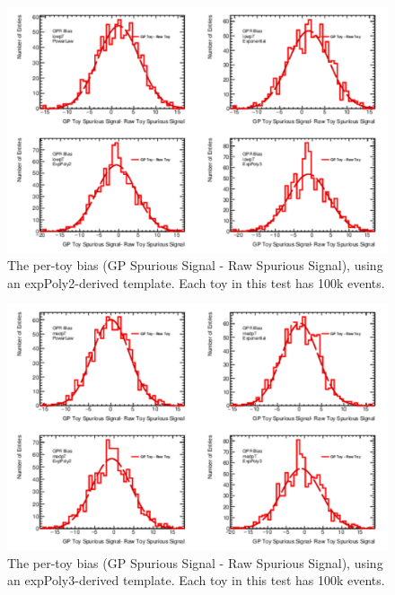 \begin{figure} 
\begin{center}
  \includegraphics[width=\textwidth]{figures/background/gpr/validation/nominal/ToyTest_FitSigBiases_lowpT_100k_noSig}   
\caption{The per-toy bias (GP Spurious Signal - Raw Spurious Signal), using an expPoly2-derived template. Each toy in this test has 100k events.}
\label{fig:bias_lowpt_100k_noSig}
\end{center}
\end{figure}

\begin{figure} 
\begin{center}
  \includegraphics[width=\textwidth]{figures/background/gpr/validation/nominal/ToyTest_FitSigBiases_medpT_100k_noSig}   
\caption{The per-toy bias (GP Spurious Signal - Raw Spurious Signal), using an expPoly3-derived template. Each toy in this test has 100k events.}
\label{fig:bias_medpt_100k_noSig}
\end{center}
\end{figure}

